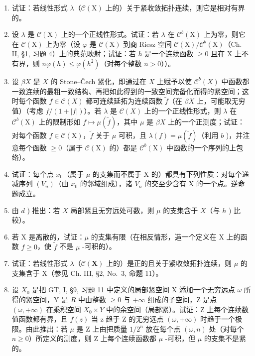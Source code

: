 \begin{enumerate}
\def\labelenumi{\alph{enumi})}
\item
  试证：若线性形式 \(\lambda\)（\(\mathcal{C}(\mathrm{X})\) 上的）关于紧收敛拓扑连续，则它是相对有界的。
\item
  设 \(\lambda\) 是 \(\mathcal{C}(\mathrm{X})\) 上的一个正线性形式。试证：若 \(\lambda\) 在 \(\mathcal{C}^b (\mathrm{X})\) 上为零，则它在 \(\mathcal{C}(\mathrm{X})\) 上为零（设 \(\varphi\) 是 \(\mathcal{C}(\mathrm{X})\) 到商 Riesz 空间 \(\mathcal{C}(\mathrm{X}) / \mathcal{C}^b (\mathrm{X})\)（Ch. II, §1, 习题 4）上的典范映射；试证：若 \(h\) 是一个连续函数 \(\geqslant 0\) 且在 \(\mathrm{X}\) 上不有界，则 \(n\varphi (h)\leqslant \varphi (h^{2})\)（对每个整数 \(n > 0\)））。
\item
  设 \(\beta X\) 是 \(X\) 的 Stone--Čech 紧化，即通过在 \(X\) 上赋予以使 \(\mathcal{C}^b(X)\) 中函数都一致连续的最粗一致结构、再把如此得到的一致空间完备化而得的紧空间；这时每个函数 \(f \in \mathcal{C}(X)\) 都可连续延拓为连续函数 \(\widetilde{f}\)（在 \(\beta X\) 上，可能取无穷值）（考虑 \(f/(1 + |f|)\)）。若 \(\lambda\) 是 \(\mathcal{C}(X)\) 上的一个正线性形式，则 \(\lambda\) 在 \(\mathcal{C}^b (\mathrm{X})\) 上的限制形如 \(f\mapsto \mu (\widetilde{f})\)，其中 \(\mu\) 是 \(\beta X\) 上的一个正测度；试证：对每个函数 \(f\in \mathcal{C}(\mathrm{X})\)，\(\widetilde{f}\) 关于 \(\mu\) 可积，且 \(\lambda (f) = \mu (\widetilde{f})\)（利用 \(b\) )，并注意每个函数 \(\geqslant 0\)（属于 \(\mathcal{C}(\mathrm{X})\) 的）都是 \(\mathcal{C}^b (\mathrm{X})\) 中函数的一个序列的上包络）。
\item
  试证：每个点 \(x_{0}\)（属于 \(\mu\) 的支集而不属于 X 的）都具有下列性质：对每个递减序列 \((V_{n})\)（由 \(x_{0}\) 的邻域组成），诸 \(V_{n}\) 的交至少含有 X 的一个点。逆命题成立。
\item
  由 \(d\) ) 推出：若 \(X\) 局部紧且无穷远处可数，则 \(\mu\) 的支集含于 \(X\)（与 \(h\) ) 比较）。
\item
  若 X 是离散的，试证：\(\mu\) 的支集有限（在相反情形，造一个定义在 X 上的函数 \(f \geqslant 0\)，使 \(\widetilde{f}\) 不是 \(\mu\) -可积的）。
\item
  试证：若线性形式 \(\lambda\)（\(\mathcal{C}(\mathbf{X})\) 上的）是正的且关于紧收敛拓扑连续，则 \(\mu\) 的支集含于 X（参见 Ch. III, §2, No.~3, 命题 11）。
\item
  设 \(X_{0}\) 是把 GT, I, §9, 习题 11 中定义的局部紧空间 X 添加一个无穷远点 \(\omega\) 所得的紧空间，Y 是 \(\overline{R}\) 中由整数 \(\geqslant 0\) 与 \(+\infty\) 组成的子空间，Z 是点 \((\omega, +\infty)\) 在乘积空间 \(X_{0} \times Y\) 中的余空间（局部紧）。试证：Z 上每个连续数值函数都有界，且 \(f(z)\) 当 z 趋于 Z 的无穷远点 \((\omega, +\infty)\) 时趋于一个极限。由此推出：若 \(\mu\) 是 Z 上由把质量 \(1/2^{n}\) 放在每个点 \((\omega, n)\) 处（对每个 \(n \geqslant 0\)）所定义的测度，则 Z 上每个连续函数都 \(\mu\) -可积，但 \(\mu\) 的支集不是紧的。
\end{enumerate}

